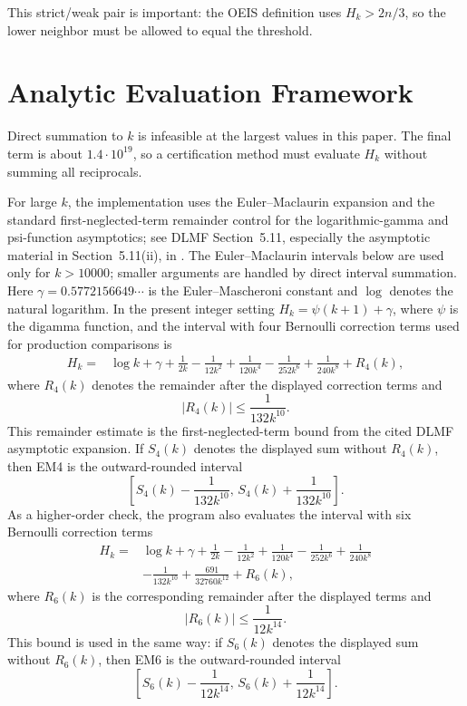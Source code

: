 \documentclass[11pt]{article}
\theoremstyle{definition}
\theoremstyle{remark}
\begin{document}
This strict/weak pair is important: the OEIS definition uses \(H_k>2n/3\), so
the lower neighbor must be allowed to equal the threshold.

\section{Analytic Evaluation Framework}

Direct summation to \(k\) is infeasible at the largest values in this paper.
The final term is about \(1.4\cdot 10^{19}\), so a certification method must
evaluate \(H_k\) without summing all reciprocals.

For large \(k\), the implementation uses the Euler--Maclaurin expansion and
the standard first-neglected-term remainder control for the logarithmic-gamma
and psi-function asymptotics; see DLMF Section~5.11, especially the
asymptotic material in Section~5.11(ii), in \cite{dlmf}.  The
Euler--Maclaurin intervals below are used only for \(k>10000\); smaller
arguments are handled by direct interval summation.  Here
\(\gamma=0.5772156649\cdots\) is the Euler--Mascheroni constant and \(\log\)
denotes the natural logarithm.  In the present integer setting
\(H_k=\psi(k+1)+\gamma\), where \(\psi\) is the digamma function, and the
interval with four Bernoulli correction terms used for production comparisons
is
\[
\begin{aligned}
H_k ={}& \log k+\gamma+\frac{1}{2k}
        -\frac{1}{12k^2}+\frac{1}{120k^4}
        -\frac{1}{252k^6}+\frac{1}{240k^8}+R_4(k),
\end{aligned}
\]
where \(R_4(k)\) denotes the remainder after the displayed correction terms and
\[
  |R_4(k)|\leq \frac{1}{132k^{10}}.
\]
This remainder estimate is the first-neglected-term bound from the cited DLMF
asymptotic expansion.  If \(S_4(k)\) denotes the displayed sum without
\(R_4(k)\), then EM4 is the outward-rounded interval
\[
  \left[S_4(k)-\frac{1}{132k^{10}},\,
        S_4(k)+\frac{1}{132k^{10}}\right].
\]
As a higher-order check, the program also evaluates the interval with six
Bernoulli correction terms
\[
\begin{aligned}
H_k ={}& \log k+\gamma+\frac{1}{2k}
        -\frac{1}{12k^2}+\frac{1}{120k^4}
        -\frac{1}{252k^6}+\frac{1}{240k^8}\\
       &-\frac{1}{132k^{10}}+\frac{691}{32760k^{12}}+R_6(k),
\end{aligned}
\]
where \(R_6(k)\) is the corresponding remainder after the displayed terms and
\[
  |R_6(k)|\leq \frac{1}{12k^{14}}.
\]
This bound is used in the same way: if \(S_6(k)\) denotes the displayed sum
without \(R_6(k)\), then EM6 is the outward-rounded interval
\[
  \left[S_6(k)-\frac{1}{12k^{14}},\,
        S_6(k)+\frac{1}{12k^{14}}\right].
\]
\end{document}
